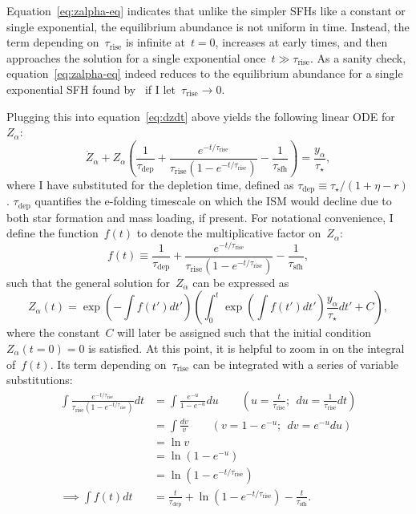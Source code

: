 \documentclass[12pt]{article}
\newcommand{\timescale}[1]{\ensuremath{\tau_\text{#1}}}
\begin{document}
Equation~\ref{eq:zalpha-eq} indicates that unlike the simpler SFHs like a
constant or single exponential, the equilibrium abundance is not uniform in
time.
Instead, the term depending on~\timescale{rise} is infinite at~$t = 0$,
increases at early times, and then approaches the solution for a single
exponential once~$t \gg \timescale{rise}$.
As a sanity check, equation~\ref{eq:zalpha-eq} indeed reduces to the
equilibrium abundance for a single exponential SFH found
by~\citet*{Weinberg2017} if I let~$\timescale{rise} \rightarrow 0$.
\par
Plugging this into equation~\ref{eq:dzdt} above yields the following linear
ODE for~$Z_\alpha$:
\begin{equation}
\dot{Z}_\alpha + Z_\alpha \left(\frac{1}{\timescale{dep}} +
\frac{
	e^{-t / \timescale{rise}}
}{
	\timescale{rise}(1 - e^{-t / \timescale{rise}})
} - \frac{1}{\timescale{sfh}}\right) = \frac{y_\alpha}{\tau_\star},
\end{equation}
where I have substituted for the depletion time, defined as
$\timescale{dep} \equiv \tau_\star / (1 + \eta - r)$.
$\timescale{dep}$ quantifies the e-folding timescale on which the ISM would
decline due to both star formation and mass loading, if present.
For notational convenience, I define the function~$f(t)$ to denote the
multiplicative factor on~$Z_\alpha$:
\begin{equation}
f(t) \equiv \frac{1}{\timescale{dep}} + \frac{
	e^{-t / \timescale{rise}}
}{
	\timescale{rise}(1 - e^{-t / \timescale{rise}})
} - \frac{1}{\timescale{sfh}},
\end{equation}
such that the general solution for~$Z_\alpha$ can be expressed as
\begin{equation}
Z_\alpha(t) = \exp\left(-\int f(t') dt'\right)\left(
\int_0^t \exp\left(\int f(t') dt'\right) \frac{y_\alpha}{\tau_\star} dt' + C
\right),
\label{eq:za-linear-ode}
\end{equation}
where the constant~$C$ will later be assigned such that the initial
condition~$Z_\alpha(t = 0) = 0$ is satisfied.
At this point, it is helpful to zoom in on the integral of~$f(t)$.
Its term depending on~$\timescale{rise}$ can be integrated with a series of
variable substitutions:
\begin{subequations}\begin{align}
\int \frac{
	e^{-t / \timescale{rise}}
}{
	\timescale{rise}(1 - e^{-t / \timescale{rise}})
} dt
&= \int \frac{e^{-u}}{1 - e^{-u}} du
\qquad \left(u = \frac{t}{\timescale{rise}};~~du = \frac{1}{\timescale{rise}}
dt\right)
\\
&= \int \frac{dv}{v} \qquad \left(v = 1 - e^{-u};~~dv = e^{-u} du\right)
\\
&= \ln v
\\
&= \ln (1 - e^{-u})
\\
&= \ln (1 - e^{-t / \timescale{rise}})
\\
\implies \int f(t) dt
&= \frac{t}{\timescale{dep}} + \ln (1 - e^{-t / \timescale{rise}}) -
\frac{t}{\timescale{sfh}}.
\end{align}\end{subequations}
\end{document}
